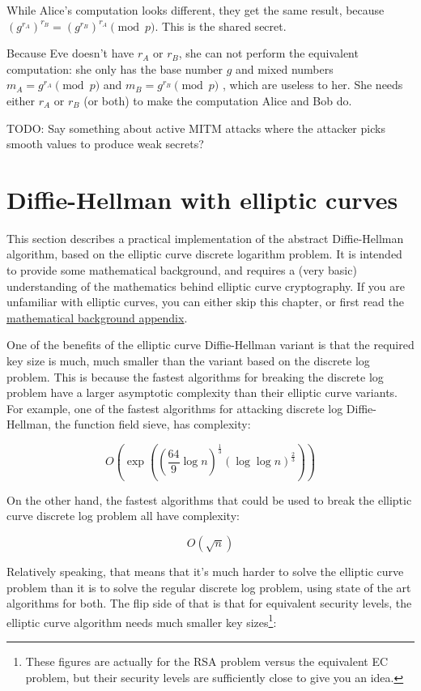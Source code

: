 \documentclass[11pt,ebook,table,dvipsnames]{memoir}
\begin{document}
While Alice's computation looks different, they get the same result,
because $(g^{r_A})^{r_B} = (g^{r_B})^{r_A} \pmod{p}$. This is the
shared secret.

Because Eve doesn't have $r_A$ or $r_B$, she can not perform the
equivalent computation: she only has the base number $g$ and mixed
numbers $m_A = g^{r_A} \pmod{p}$ and $m_B = g^{r_B} \pmod{p}$ , which
are useless to her. She needs either $r_A$ or $r_B$ (or both) to
make the computation Alice and Bob do.

TODO: Say something about active MITM attacks where the attacker
picks smooth values to produce weak secrets?
\section{Diffie-Hellman with elliptic curves}
\label{sec-2-4-4}

This section describes a practical implementation of the abstract
Diffie-Hellman algorithm, based on the elliptic curve discrete
logarithm problem. It is intended to provide some mathematical
background, and requires a (very basic) understanding of the
mathematics behind elliptic curve cryptography. If you are unfamiliar
with elliptic curves, you can either skip this chapter, or first read
the \hyperref[Elliptic-curves]{mathematical background appendix}.

One of the benefits of the elliptic curve Diffie-Hellman variant is
that the required key size is much, much smaller than the variant
based on the discrete log problem. This is because the fastest
algorithms for breaking the discrete log problem have a larger
asymptotic complexity than their elliptic curve variants. For example,
one of the fastest algorithms for attacking discrete log
Diffie-Hellman, the function field sieve, has complexity:

\[
O\left(\exp\left(\left(\frac{64}{9} \log n\right)^{\frac{1}{3}} (\log \log n)^{\frac{2}{3}}\right)\right)
\]

On the other hand, the fastest algorithms that could be used to break
the elliptic curve discrete log problem all have complexity:

\[
O(\sqrt{n})
\]

Relatively speaking, that means that it's much harder to solve the
elliptic curve problem than it is to solve the regular discrete log
problem, using state of the art algorithms for both. The flip side of
that is that for equivalent security levels, the elliptic curve
algorithm needs much smaller key
sizes\cite{rsa:keysizes}\cite{nist:keymanagement}\footnote{These figures are
actually for the RSA problem versus the equivalent EC problem, but
their security levels are sufficiently close to give you an idea.}:
\end{document}
